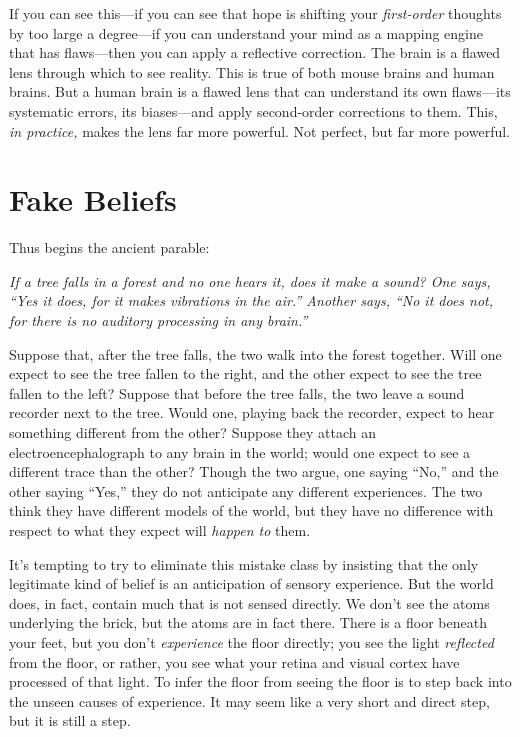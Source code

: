 {
 If you can see this---if you can see that hope is shifting your
\textit{first-order} thoughts by too large a degree---if you can
understand your mind as a mapping engine that has flaws---then you can
apply a reflective correction. The brain is a flawed lens through which
to see reality. This is true of both mouse brains and human brains. But
a human brain is a flawed lens that can understand its own flaws---its
systematic errors, its biases---and apply second-order corrections to
them. This, \textit{in practice,} makes the lens far more powerful. Not
perfect, but far more powerful.}

\myendsectiontext


\bigskip


\chapter{Fake Beliefs}


{
 Thus begins the ancient parable: }

{
 \textit{If a tree falls in a forest and no one hears it, does it
make a sound? One says, ``Yes it does, for it makes
vibrations in the air.'' Another says,
``No it does not, for there is no auditory processing
in any brain.''}}

{
 Suppose that, after the tree falls, the two walk into the forest
together. Will one expect to see the tree fallen to the right, and the
other expect to see the tree fallen to the left? Suppose that before
the tree falls, the two leave a sound recorder next to the tree. Would
one, playing back the recorder, expect to hear something different from
the other? Suppose they attach an electroencephalograph to any brain in
the world; would one expect to see a different trace than the other?
Though the two argue, one saying
``No,'' and the other saying
``Yes,'' they do not anticipate any
different experiences. The two think they have different models of the
world, but they have no difference with respect to what they expect
will \textit{happen to} them.}

{
 It's tempting to try to eliminate this mistake
class by insisting that the only legitimate kind of belief is an
anticipation of sensory experience. But the world does, in fact,
contain much that is not sensed directly. We don't see
the atoms underlying the brick, but the atoms are in fact there. There
is a floor beneath your feet, but you don't
\textit{experience} the floor directly; you see the light
\textit{reflected} from the floor, or rather, you see what your retina
and visual cortex have processed of that light. To infer the floor from
seeing the floor is to step back into the unseen causes of experience.
It may seem like a very short and direct step, but it is still a step.}

